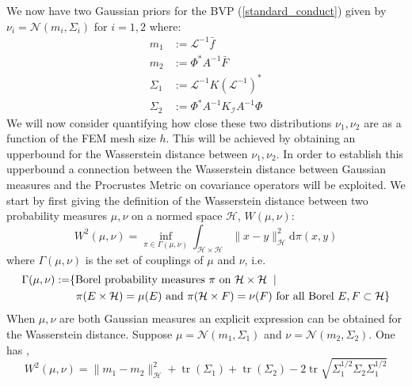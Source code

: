 We now have two Gaussian priors for the BVP (\ref{standard_conduct}) given by $\nu_{i}=\mathcal{N}(m_{i},\Sigma_{i})$ for $i=1,2$ where:
\begin{align}
    \label{true_fem_mean}
    m_{1} &:= \mathcal{L}^{-1}\bar{f} \\
    \label{approx_fem_mean}
    m_{2} &:= \Phi^{*}A^{-1}\bar{F} \\
    \label{true_fem_cov}
    \Sigma_{1} &:= \mathcal{L}^{-1}K(\mathcal{L}^{-1})^{*} \\
    \label{approx_fem_cov}
    \Sigma_{2} &:= \Phi^{*}A^{-1}K_{\mathcal{I}}A^{-1}\Phi
\end{align}
We will now consider quantifying how close these two distributions $\nu_1,\nu_2$ are as a function of the FEM mesh size $h$. This will be achieved by obtaining an upperbound for the Wasserstein distance between $\nu_1,\nu_2$. In order to establish this upperbound a connection between the Wasserstein distance between Gaussian measures and the Procrustes Metric on covariance operators \textcolor{blue}{\citep{masarotto2019procrustes}} will be exploited. We start by first giving the definition of the Wasserstein distance between two probability measures $\mu,\nu$ on a normed space $\mathcal{H}$, $W(\mu,\nu)$:
\begin{equation}
    \label{wasserstein_def}
    W^{2}(\mu,\nu)=\inf_{\pi\in\Gamma(\mu,\nu)}\int_{\mathcal{H}\times\mathcal{H}}\|x-y\|^{2}_{\mathcal{H}}\mathrm{d}\pi(x,y)
\end{equation}
where $\Gamma(\mu,\nu)$ is the set of couplings of $\mu$ and $\nu$, i.e.
\begin{align*}
    \Gamma(\mu,\nu):=&\{\text{Borel probability measures } \pi \text{ on } \mathcal{H}\times\mathcal{H} \hspace{0.2cm} | \\
    &\hspace{0.2cm} \pi(E\times\mathcal{H})=\mu(E) \text{ and } \pi(\mathcal{H}\times F)=\nu(F) \text{ for all Borel } E,F\subset\mathcal{H} \}
\end{align*}
When $\mu,\nu$ are both Gaussian measures an explicit expression can be obtained for the Wasserstein distance. Suppose $\mu=\mathcal{N}(m_1,\Sigma_1)$ and $\nu=\mathcal{N}(m_2,\Sigma_2)$. One has \textcolor{blue}{\citep{masarotto2019procrustes}},
\begin{equation}
    W^{2}(\mu,\nu)=\|m_1-m_2\|^{2}_{\mathcal{H}}+\operatorname{tr}(\Sigma_1)+\operatorname{tr}(\Sigma_2)-2\operatorname{tr}\sqrt{\Sigma_{1}^{1/2}\Sigma_{2}\Sigma_{1}^{1/2}}
\end{equation}

